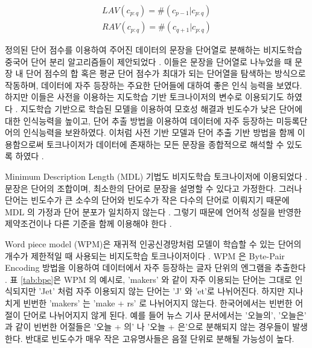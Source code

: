 \documentclass[oneside, ko,phd]{snuthesis_utf8_kor}
\begin{document}
\begin{equation}
\label{eq:av}
\begin{aligned}
LAV(c_{p:q}) = \# (c_{p-1} \vert c_{p:q}) \\
RAV(c_{p:q}) = \# (c_{q+1} \vert c_{p:q}) 
\end{aligned}
\end{equation}

정의된 단어 점수를 이용하여 주어진 데이터의 문장을 단어열로 분해하는 비지도학습 중국어 단어 분리 알고리즘들이 제안되었다 \cite{zhao2008exploiting, feng2004unsupervised}.
이들은 문장을 단어열로 나누었을 때 문장 내 단어 점수의 합 혹은 평균 단어 점수가 최대가 되는 단어열을 탐색하는 방식으로 작동하며, 데이터에 자주 등장하는 주요한 단어들에 대하여 좋은 인식 능력을 보였다.
하지만 이들은 사전을 이용하는 지도학습 기반 토크나이저의 변수로 이용되기도 하였다 \cite{zhao2007incorporating, zhao2008unsupervised, zhao2011integrating, sun2011enhancing, zheng2013deep}.
지도학습 기반으로 학습된 모델을 이용하여 모호성 해결과 빈도수가 낮은 단어에 대한 인식능력을 높이고, 단어 추출 방법을 이용하여 데이터에 자주 등장하는 미등록단어의 인식능력을 보완하였다.
이처럼 사전 기반 모델과 단어 추출 기반 방법을 함께 이용함으로써 토크나이저가 데이터에 존재하는 모든 문장을 종합적으로 해석할 수 있도록 하였다 \cite{zhao2007incorporating}. 

Minimum Description Length (MDL) 기법도 비지도학습 토크나이저에 이용되었다 \cite{kityz1999unsupervised, hewlett2011fully, zhikov2013efficient}.
문장은 단어의 조합이며, 최소한의 단어로 문장을 설명할 수 있다고 가정한다.
그러나 단어는 빈도수가 큰 소수의 단어와 빈도수가 작은 다수의 단어로 이뤄지기 때문에 MDL 의 가정과 단어 분포가 일치하지 않는다 \cite{magistry2013can}.
그렇기 때문에 언어적 성질을 반영한 제약조건이나 다른 기준을 함께 이용해야 한다 \cite{magistry2013can, hewlett2011fully}.

Word piece model (WPM)은 재귀적 인공신경망처럼 모델이 학습할 수 있는 단어의 개수가 제한적일 때 사용되는 비지도학습 토크나이저이다 \cite{sennrich2015neural}.
WPM 은 Byte-Pair Encoding 방법을 이용하여 데이터에서 자주 등장하는 글자 단위의 엔그램을 추출한다 \cite{shibata1999byte}.
표 \ref{tab:bpe}은 WPM 의 예시로, 'makers' 와 같이 자주 이용되는 단어는 그대로 인식되지만 'Jet' 처럼 자주 이용되지 않는 단어는 'J' 와 'et'로 나뉘어진다.
하지만 지나치게 빈번한 'makers' 는 'make + rs' 로 나뉘어지지 않는다.
한국어에서는 빈번한 어절이 단어로 나뉘어지지 않게 된다.
예를 들어 뉴스 기사 문서에서는 '오늘의', '오늘은' 과 같이 빈번한 어절들은 '오늘 + 의' 나 '오늘 + 은'으로 분해되지 않는 경우들이 발생한다.
반대로 빈도수가 매우 작은 고유명사들은 음절 단위로 분해될 가능성이 높다.
\end{document}
